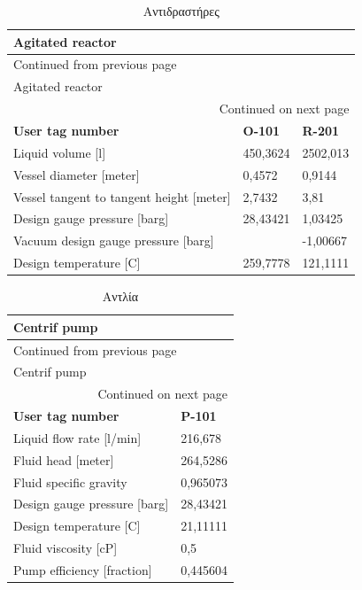 \documentclass[11pt]{article}
\begin{document}
\begin{longtable}{lll}
\caption{Αντιδραστήρες}
\\
Agitated reactor &  & \\
\hline
\endfirsthead
\multicolumn{3}{l}{Continued from previous page} \\
\hline

Agitated reactor &  &  \\

\hline
\endhead
\hline\multicolumn{3}{r}{Continued on next page} \\
\endfoot
\endlastfoot
\hline
\textbf{User tag number} & \textbf{O-101} & \textbf{R-201}\\
Liquid volume [l] & 450,3624 & 2502,013\\
Vessel diameter [meter] & 0,4572 & 0,9144\\
Vessel tangent to tangent height [meter] & 2,7432 & 3,81\\
Design gauge pressure [barg] & 28,43421 & 1,03425\\
Vacuum design gauge pressure [barg] &  & -1,00667\\
Design temperature [C] & 259,7778 & 121,1111\\
\end{longtable}

\begin{longtable}{ll}
\caption{Αντλία}
\\
Centrif pump & \\
\hline
\endfirsthead
\multicolumn{2}{l}{Continued from previous page} \\
\hline

Centrif pump &  \\

\hline
\endhead
\hline\multicolumn{2}{r}{Continued on next page} \\
\endfoot
\endlastfoot
\hline
\textbf{User tag number} & \textbf{P-101}\\
Liquid flow rate [l/min] & 216,678\\
Fluid head [meter] & 264,5286\\
Fluid specific gravity & 0,965073\\
Design gauge pressure [barg] & 28,43421\\
Design temperature [C] & 21,11111\\
Fluid viscosity [cP] & 0,5\\
Pump efficiency [fraction] & 0,445604\\
\end{longtable}
\end{document}

